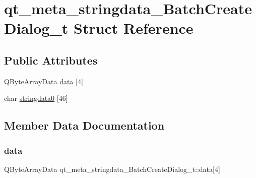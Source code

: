 \hypertarget{structqt__meta__stringdata___batch_create_dialog__t}{}\section{qt\+\_\+meta\+\_\+stringdata\+\_\+\+Batch\+Create\+Dialog\+\_\+t Struct Reference}
\label{structqt__meta__stringdata___batch_create_dialog__t}
\subsection*{Public Attributes}
\begin{DoxyCompactItemize}
\item 
Q\+Byte\+Array\+Data \mbox{\hyperlink{structqt__meta__stringdata___batch_create_dialog__t_ac54337dc2781d56d0c4958b63ca206bd}{data}} \mbox{[}4\mbox{]}
\item 
char \mbox{\hyperlink{structqt__meta__stringdata___batch_create_dialog__t_a1567252e0619ac52e572a92551897ccc}{stringdata0}} \mbox{[}46\mbox{]}
\end{DoxyCompactItemize}


\subsection{Member Data Documentation}
\mbox{\label{structqt__meta__stringdata___batch_create_dialog__t_ac54337dc2781d56d0c4958b63ca206bd}} 
\subsubsection{\texorpdfstring{data}{data}}
{\footnotesize\ttfamily Q\+Byte\+Array\+Data qt\+\_\+meta\+\_\+stringdata\+\_\+\+Batch\+Create\+Dialog\+\_\+t\+::data\mbox{[}4\mbox{]}}

\mbox{\label{structqt__meta__stringdata___batch_create_dialog__t_a1567252e0619ac52e572a92551897ccc}} 
